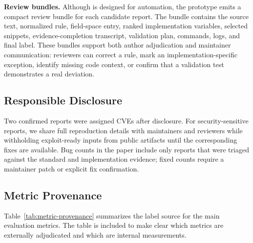 \textbf{Review bundles.}
Although \tool{} is designed for automation, the prototype emits a compact
review bundle for each candidate report. The bundle contains the source text,
normalized rule, field-space entry, ranked implementation variables, selected
snippets, evidence-completion transcript, validation plan, commands, logs, and
final label. These bundles support both author adjudication and maintainer
communication: reviewers can correct a rule, mark an implementation-specific
exception, identify missing code context, or confirm that a validation test
demonstrates a real deviation.

\subsection{Responsible Disclosure}

Two confirmed reports were assigned CVEs after disclosure. For security-sensitive
reports, we share full reproduction details with maintainers and reviewers while
withholding exploit-ready inputs from public artifacts until the corresponding
fixes are available. Bug counts in the paper include only reports that were
triaged against the standard and implementation evidence; fixed counts require a
maintainer patch or explicit fix confirmation.

\subsection{Metric Provenance}

Table~\ref{tab:metric-provenance} summarizes the label source for the main
evaluation metrics. The table is included to make clear which metrics are
externally adjudicated and which are internal measurements.

